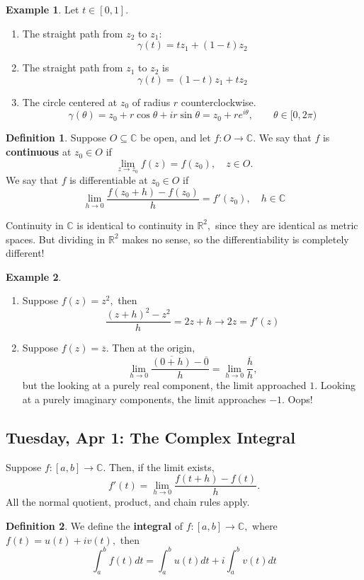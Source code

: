 \documentclass[10pt, oneside]{article}
\newcommand{\bbR}{\mathbb{R}}
\newcommand{\bbC}{\mathbb{C}}
\theoremstyle{definition}
\newtheorem{exmp}{Example}[section]
\newtheorem{defn}{Definition}
\newcommand{\bbC}{\mathbb{C}}
\newcommand{\bbR}{\mathbb{R}}
\begin{document}
\begin{exmp}
Let $t\in [0,1].$ \begin{enumerate}
    \item The straight path from $z_2$ to $z_1$:
    \[\gamma(t) = tz_1 + (1-t)z_2\]
    \item The straight path from $z_1$ to $z_2$ is 
    \[\gamma(t) = (1-t)z_1 + tz_2\]
    \item The circle centered at $z_0$ of radius $r$ counterclockwise. 
    \[\gamma(\theta) = z_0 + r\cos\theta  + ir\sin\theta = z_0 + re^{i\theta}, \qquad \theta \in [0, 2\pi)\]
\end{enumerate}
\end{exmp}

\begin{defn}
    Suppose $O \subseteq \bbC$ be open, and let $f: O \to \bbC.$ We say that $f$ is \textbf{continuous} at $z_0 \in O$ if 
    \[\lim_{z \to z_0}f(z) = f(z_0), \quad z \in O.\] We say that $f$ is differentiable at $z_0 \in O$ if 
    \[\lim_{h\to 0}\frac{f(z_0 + h) - f(z_0)}{h} = f'(z_0), \quad h \in \bbC\]
\end{defn}
Continuity in $\bbC$ is identical to continuity in $\bbR^2,$ since they are identical as metric spaces. But dividing in $\bbR^2$ makes no sense, so the differentiability is completely different!
\begin{exmp}
    \begin{enumerate}
        \item Suppose $f(z) = z^2,$ then 
        \[\frac{(z + h)^2 - z^2}{h} = 2z + h \to 2z = f'(z)\]
        \item Suppose $f(z) = \overline{z}.$ Then at the origin, 
        \[\lim_{h\to 0}\frac{\overline{(0 + h)} - \overline{0}}{h}= \lim_{h\to 0}\frac{\overline{h}}{h},\] but the looking at a purely real component, the limit approached $1.$ Looking at a purely imaginary components, the limit approaches $-1.$ Oops!
    \end{enumerate}
\end{exmp}

\newpage
\subsection{Tuesday, Apr 1: The Complex Integral}
Suppose $f: [a,b] \to \bbC.$ Then, if the limit exists,
\[f'(t) = \lim_{h\to 0}\frac{f(t+  h) - f(t)}{h}.\] All the normal quotient, product, and chain rules apply.

\begin{defn}
    We define the \textbf{integral} of $f: [a,b] \to \bbC,$ where $f(t) = u(t) + iv(t),$ then 
    \[\int_a^b f(t)dt = \int_a^b u(t)dt + i \int_a^b v(t)dt\]
\end{defn}
\end{document}
